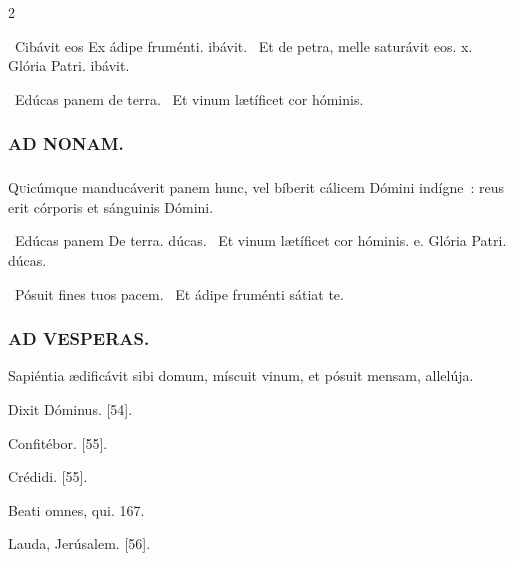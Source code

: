 \documentclass[9pt,twoside]{extarticle}
\begin{document}
\begin{multicols}{2}
{{\begin{tightlist}{}
\item {}~Cibávit eos \textred{*} Ex ádipe fruménti. ibávit. ~Et de petra, melle saturávit eos. x. Glória Patri. ibávit.
\item {}~Edúcas panem de terra. ~Et vinum lætíficet cor hóminis.
\end{tightlist}

\subsubsection*{\center \textsc{AD NONAM.}}
\subsubsection*{}
\lettrine{Q}uicúmque manducáverit panem hunc, vel bíberit cálicem Dómini indígne~: reus erit córporis et sánguinis Dómini.

\begin{tightlist}{}
\item {}~Edúcas panem \textred{*} De terra. dúcas. ~Et vinum lætíficet cor hóminis. e. Glória Patri. dúcas.
\item {}~Pósuit fines tuos pacem. ~Et ádipe fruménti sátiat te.
\end{tightlist}

\subsubsection*{\center \textsc{AD VESPERAS.}}
\begin{tightlist}{}
\item {} Sapiéntia ædificávit sibi domum, míscuit vinum, et pósuit mensam, allelúja.
\item {} Dixit Dóminus. [54]. 
\item {} Confitébor. [55]. 
\item {} Crédidi. [55]. 
\item {} Beati omnes, qui. 167. 
\item {} Lauda, Jerúsalem. [56].
\end{tightlist}

}}
\end{multicols}
\end{document}
